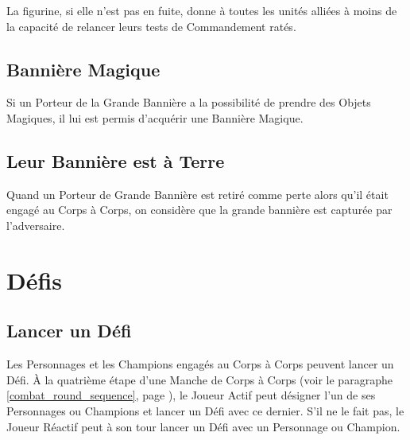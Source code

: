 La figurine, si elle n'est pas en fuite, donne à toutes les unités alliées à moins de  la capacité de relancer leurs tests de Commandement ratés. 

\subsection{Bannière Magique}

Si un Porteur de la Grande Bannière a la possibilité de prendre des Objets Magiques, il lui est permis d'acquérir une Bannière Magique. 

\subsection{Leur Bannière est à Terre}

Quand un Porteur de Grande Bannière est retiré comme perte alors qu'il était engagé au Corps à Corps, on considère que la grande bannière est capturée par l'adversaire. 

\section{Défis}

\subsection{Lancer un Défi}

Les Personnages et les Champions engagés au Corps à Corps peuvent lancer un Défi. À la quatrième étape d'une Manche de Corps à Corps (voir le paragraphe \ref{combat_round_sequence}, page \pageref{combat_round_sequence}), le Joueur Actif peut désigner l'un de ses Personnages ou Champions et lancer un Défi avec ce dernier. S'il ne le fait pas, le Joueur Réactif peut à son tour lancer un Défi avec un Personnage ou Champion.

